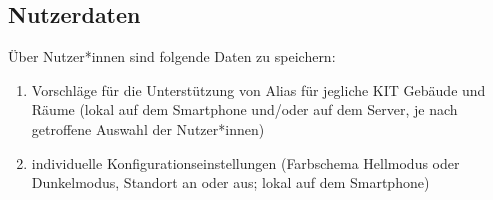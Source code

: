 \subsection{Nutzerdaten}

Über Nutzer*innen sind folgende Daten zu speichern:
\begin{enumerate}[label=\textbf{/D\arabic*0/}, align=left]
	\item Vorschläge für die Unterstützung von Alias für jegliche KIT Gebäude und Räume (lokal auf dem Smartphone und/oder auf dem Server, je nach getroffene Auswahl der Nutzer*innen)
	\item individuelle Konfigurationseinstellungen (Farbschema Hellmodus oder Dunkelmodus, Standort an oder aus; lokal auf dem Smartphone)
\end{enumerate}